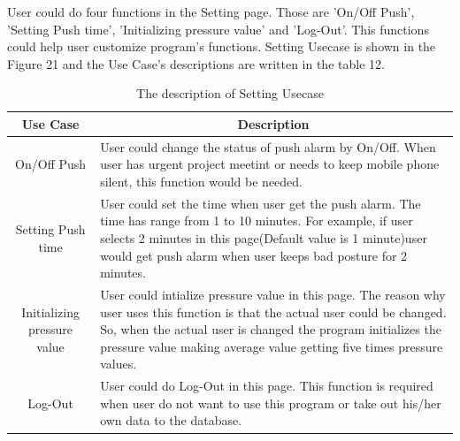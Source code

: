 \documentclass[conference]{IEEEtran}
\begin{document}
 User could do four functions in the Setting page. Those are 'On/Off Push', 'Setting Push time', 'Initializing pressure value' and 'Log-Out'. This functions could help user customize program's functions. Setting Usecase is shown in the Figure 21 and the Use Case's descriptions are written in the table 12.

\begin{table}[h]
{\renewcommand\arraystretch{1.25}
\caption{The description of Setting Usecase}
\begin{tabular}{|c|l|l|} \hline
Use Case & \multicolumn{2}{c|}{Description} \\ \hline\hline
On/Off Push & \multicolumn{2}{p{5cm}|}{\raggedright User could change the status of push alarm by On/Off. When user has urgent project meetint or needs to keep mobile phone silent, this function would be needed.} \\ \hline
Setting Push time & \multicolumn{2}{p{5cm}|}{\raggedright User could set the time when user get the push alarm. The time has range from 1 to 10 minutes. For example, if user selects 2 minutes in this page(Default value is 1 minute)user would get push alarm when user keeps bad posture for 2 minutes.  } \\ \hline
Initializing pressure value & \multicolumn{2}{p{5cm}|}{\raggedright User could intialize pressure value in this page. The reason why user uses this function is that the actual user could be changed. So, when the actual user is changed the program initializes the pressure value making average value getting five times pressure values. } \\ \hline
Log-Out & \multicolumn{2}{p{5cm}|}{\raggedright User could do Log-Out in this page. This function is required when user do not want to use this program or take out his/her own data to the database. } \\ \hline
\end{tabular}}
\end{table}
\end{document}
